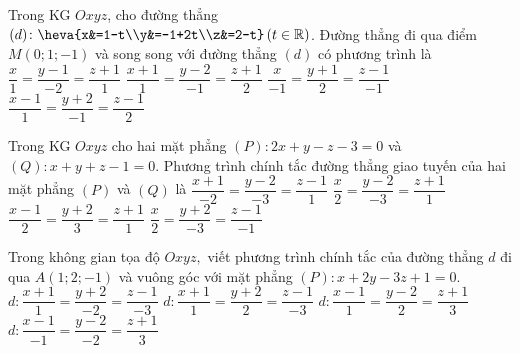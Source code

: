 \begin{ex}%
	Trong KG $Oxyz$, cho đường thẳng $(d)\colon \heva{x&=1-t\\y&=-1+2t\\z&=2-t}\,(t\in \mathbb{R})$. Đường thẳng đi qua điểm $M(0;1;-1)$ và song song với đường thẳng $(d)$ có phương trình là
	\choice
	{\True $\dfrac{x}{1}=\dfrac{y-1}{-2}=\dfrac{z+1}{1}$}
	{$\dfrac{x+1}{1}=\dfrac{y-2}{-1}=\dfrac{z+1}{2}$}
	{$\dfrac{x}{-1}=\dfrac{y+1}{2}=\dfrac{z-1}{-1}$}
	{$\dfrac{x-1}{1}=\dfrac{y+2}{-1}=\dfrac{z-1}{2}$}
\end{ex}
\begin{ex}%
	Trong KG $Oxyz$ cho hai mặt phẳng $(P): 2x + y - z - 3 = 0$ và $(Q): x + y + z - 1 = 0$. Phương trình chính tắc đường thẳng giao tuyến của hai mặt phẳng $(P)$ và $(Q)$ là 
	\choice
	{$\dfrac{x+1}{-2} = \dfrac{y - 2}{-3} = \dfrac{z - 1}{1}$}
	{\True $\dfrac{x}{2} = \dfrac{y - 2}{-3} = \dfrac{z + 1}{1}$}
	{$\dfrac{x - 1}{2} = \dfrac{y + 2}{3} = \dfrac{z + 1}{1}$}
	{$\dfrac{x}{2} = \dfrac{y + 2}{-3} = \dfrac{z - 1}{-1}$}
\end{ex}
\begin{ex}%
	Trong không gian tọa độ $Oxyz,$ viết phương trình chính tắc của đường thẳng $d$ đi qua $A(1; 2; -1)$ và vuông góc với mặt phẳng $(P)\colon x+2y-3z+1=0.$
	\choice
	{$d\colon \dfrac{x+1}{1}=\dfrac{y+2}{-2}=\dfrac{z-1}{-3}$}
	{$d\colon \dfrac{x+1}{1}=\dfrac{y+2}{2}=\dfrac{z-1}{-3}$}
	{$d\colon \dfrac{x-1}{1}=\dfrac{y-2}{2}=\dfrac{z+1}{3}$}
	{\True $d\colon \dfrac{x-1}{-1}=\dfrac{y-2}{-2}=\dfrac{z+1}{3}$}
\end{ex}
